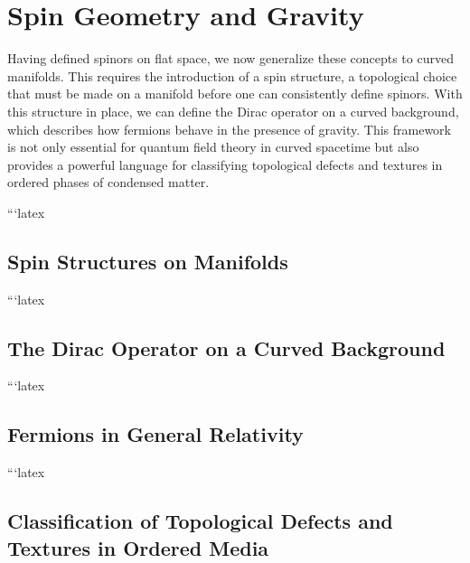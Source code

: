 \chapter{Spin Geometry and Gravity}
\label{chap:spin_geometry}

Having defined spinors on flat space, we now generalize these concepts to curved manifolds. This requires the introduction of a spin structure, a topological choice that must be made on a manifold before one can consistently define spinors. With this structure in place, we can define the Dirac operator on a curved background, which describes how fermions behave in the presence of gravity. This framework is not only essential for quantum field theory in curved spacetime but also provides a powerful language for classifying topological defects and textures in ordered phases of condensed matter.





```latex
\section{Spin Structures on Manifolds}
\label{sec:spin_structures}

```latex
\section{The Dirac Operator on a Curved Background}
\label{sec:dirac_operator_curved}

```latex
\section{Fermions in General Relativity}
\label{sec:fermions_gr}

```latex
\section{Classification of Topological Defects and Textures in Ordered Media}
\label{sec:classification_defects}

